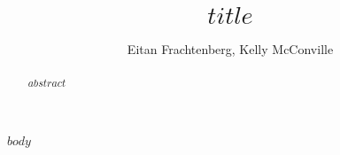 \documentclass[12pt]{article}
\title{$title$}
\author{Eitan Frachtenberg, Kelly McConville}
\begin{document}
\maketitle

\begin{abstract}
  $abstract$
\end{abstract}

$body$


%
%
\end{document}
